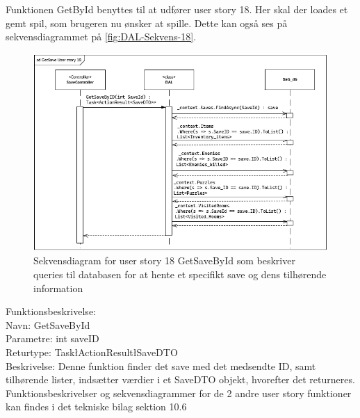 Funktionen GetById benyttes til at udfører user story 18.
Her skal der loades et gemt spil, som brugeren nu ønsker at spille. 
Dette kan også ses på sekvensdiagrammet på \autoref{fig:DAL-Sekvens-18}.\\

\begin{figure}[H]
\centering
\includegraphics[width = \textwidth]{02-Body/Images/DAL-Database/GetSavesByIdSd.PNG}
\caption{Sekvensdiagram for user story 18 GetSaveById som beskriver queries til databasen for at hente et specifikt save og dens tilhørende information}
\label{fig:DAL-Sekvens-18}
\end{figure}

Funktionsbeskrivelse:\\
Navn: GetSaveById \\
Parametre: int saveID\\
Returtype: Task\l ActionResult\l SaveDTO\g\g\\
Beskrivelse: Denne funktion finder det save med det medsendte ID, samt tilhørende lister, indsætter værdier i et SaveDTO objekt, hvorefter det returneres.\\

Funktionsbeskrivelser og sekvensdiagrammer for de 2 andre user story funktioner kan findes i det tekniske bilag sektion 10.6
